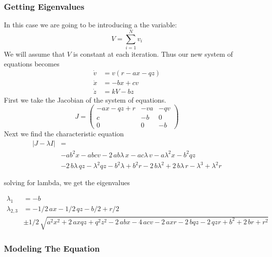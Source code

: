 \documentclass{article}
\begin{document}
\subsubsection{Getting Eigenvalues}
In this case we are going to be introducing a the variable:
\[
V = \sum_{i = 1}^N v_i
\]
We will assume that $V$ is constant at each iteration. Thus our new system of equations becomes 
\begin{equation}
	\begin{split}
		\dot v &= v(r - ax - qz) \\
		\dot x &= -bx + cv \\
		\dot z &= kV - bz
	\end{split}
\end{equation}
First we take the Jacobian of the system of equations. 
\begin{equation}
    J=
    \begin{pmatrix}
        -ax-qz+r    &-va    &-qv    \\
        c           &-b     &0      \\
        0           &0       &-b
    \end{pmatrix}
\end{equation}
Next we find the characteristic equation
\begin{equation}
    \begin{split}
        | J - \lambda I | &= \\ 
        &-a{b}^{2}x-abcv-2\,ab\lambda\,x-ac\lambda\,v-a{\lambda}^{2}x-{b}^{2}qz \\
        &-2\,b\lambda\,qz-{\lambda}^{2}qz-{b}^{2}\lambda+{b}^{2}r-2\,b{\lambda}^{2}+2\,b\lambda\,r-{\lambda}^{3}+{\lambda}^{2}r
    \end{split}
\end{equation}

solving for lambda, we get the eigenvalues

\begin{equation}
    \begin{split}
        \lambda_1 &=  -b\\
        \lambda_{2,3} &= -1/2\,ax-1/2\,qz-b/2+r/2 \\
        &\pm 1/2\,\sqrt {{a}^{2}{x}^{2}+2\,axqz+{q}^{2}{z}^{2}-2\,abx-4\,acv-2\,axr-2\,bqz-2\,qzr+{b}^{2}+2\,br+{r}^{2}}         
    \end{split}
\end{equation}


\subsubsection{Modeling The Equation}
\end{document}
